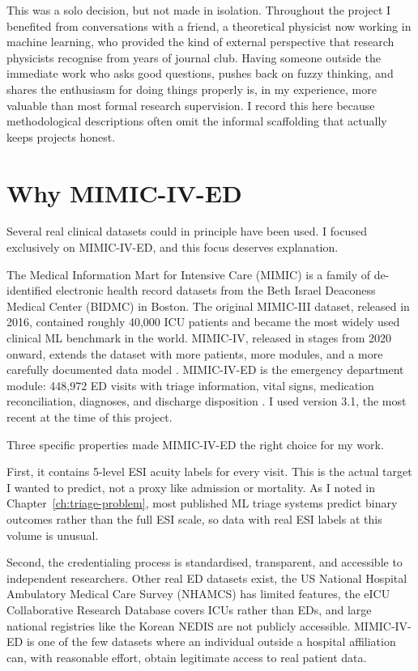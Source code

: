 \begin{remarkbox}
This was a solo decision, but not made in isolation. Throughout the project I benefited from conversations with a friend, a theoretical physicist now working in machine learning, who provided the kind of external perspective that research physicists recognise from years of journal club. Having someone outside the immediate work who asks good questions, pushes back on fuzzy thinking, and shares the enthusiasm for doing things properly is, in my experience, more valuable than most formal research supervision. I record this here because methodological descriptions often omit the informal scaffolding that actually keeps projects honest.
\end{remarkbox}

\section{Why MIMIC-IV-ED}

Several real clinical datasets could in principle have been used. I focused exclusively on MIMIC-IV-ED, and this focus deserves explanation.

The Medical Information Mart for Intensive Care (MIMIC) is a family of de-identified electronic health record datasets from the Beth Israel Deaconess Medical Center (BIDMC) in Boston. The original MIMIC-III dataset, released in 2016, contained roughly 40,000 ICU patients and became the most widely used clinical ML benchmark in the world. MIMIC-IV, released in stages from 2020 onward, extends the dataset with more patients, more modules, and a more carefully documented data model \citep{johnson2023mimiciv}. MIMIC-IV-ED is the emergency department module: 448,972 ED visits with triage information, vital signs, medication reconciliation, diagnoses, and discharge disposition \citep{xie2022mimicived}. I used version 3.1, the most recent at the time of this project.

Three specific properties made MIMIC-IV-ED the right choice for my work.

First, it contains 5-level ESI acuity labels for every visit. This is the actual target I wanted to predict, not a proxy like admission or mortality. As I noted in Chapter~\ref{ch:triage-problem}, most published ML triage systems predict binary outcomes rather than the full ESI scale, so data with real ESI labels at this volume is unusual.

Second, the credentialing process is standardised, transparent, and accessible to independent researchers. Other real ED datasets exist, the US National Hospital Ambulatory Medical Care Survey (NHAMCS) has limited features, the eICU Collaborative Research Database covers ICUs rather than EDs, and large national registries like the Korean NEDIS are not publicly accessible. MIMIC-IV-ED is one of the few datasets where an individual outside a hospital affiliation can, with reasonable effort, obtain legitimate access to real patient data.

